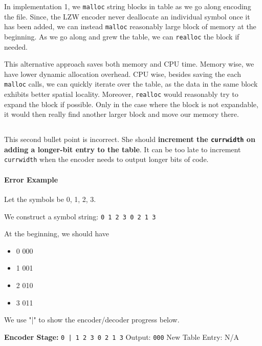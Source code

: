 \documentclass[12pt]{article}
\begin{document}
In implementation 1, we \texttt{malloc} string blocks in table as we go along encoding the file. Since, the LZW encoder never deallocate an individual symbol once it has been added, we can instead \texttt{malloc} reasonably large block of memory at the beginning. As we go along and grew the table, we can \texttt{realloc} the block if needed.

This alternative approach saves both memory and CPU time. Memory wise, we have lower dynamic allocation overhead. CPU wise, besides saving the each \texttt{malloc} calls, we can quickly iterate over the table, as the data in the same block exhibits better spatial locality. Moreover, \texttt{realloc} would reasonably try to expand the block if possible. Only in the case where the block is not expandable, it would then really find another larger block and move our memory there. 

\subsection{}

This second bullet point is incorrect. She should \textbf{increment the \texttt{currwidth} on adding a longer-bit entry to the table}. It can be too late to increment \texttt{currwidth} when the encoder needs to output longer bits of code.

\paragraph*{Error Example}

Let the symbols be 0, 1, 2, 3.

We construct a symbol string: \texttt{0 1 2 3 0 2 1 3}

At the beginning, we should have
\begin{itemize}[topsep=0pt]\itemsep-0.6em 
    \item 0 \textrightarrow{}000
    \item 1 \textrightarrow{}001
    \item 2 \textrightarrow{}010
    \item 3 \textrightarrow{}011
\end{itemize}

We use "|" to show the encoder/decoder progress below.

\textbf{Encoder Stage:} \texttt{0 | 1 2 3 0 2 1 3}
\newline Output: \texttt{000}
\newline New Table Entry: N/A
\end{document}
